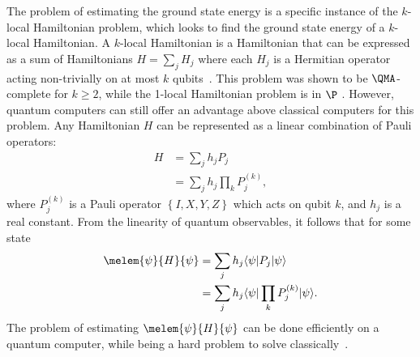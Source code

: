 The problem of estimating the ground state energy is a specific instance of the $k$-local Hamiltonian problem, which looks to find the ground state energy of a $k$-local Hamiltonian.
A $k$-local Hamiltonian is a Hamiltonian that can be expressed as a sum of Hamiltonians $H = \sum_{j}H_j$ where each $H_j$ is a Hermitian operator acting non-trivially on at most $k$ qubits~\cite{bookatz2012qma}.
This problem was shown to be $\QMA$-complete for $k \geq 2$, while the 1-local Hamiltonian problem is in $\P$ \cite{kempe2006complexity}.
However, quantum computers can still offer an advantage above classical computers for this problem.
Any Hamiltonian $H$ can be represented as a linear combination of Pauli operators:
\begin{align}
H &= \sum_j h_j P_j \\
  &= \sum_j h_j \prod_k P_j^{(k)},
\end{align} 
where $P_j^{(k)}$ is a Pauli operator $\left\{I, X, Y, Z\right\}$ which acts on qubit $k$, and $h_j$ is a real constant.
From the linearity of quantum observables, it follows that for some state \ket{\psi}
\begin{align}
\melem{\psi}{H}{\psi} &= \sum_j h_j \bra{\psi}P_j\ket{\psi} \\
&= \sum_j h_j \bra{\psi}\prod_k P_j^{(k)}\ket{\psi}.
\end{align} 
The problem of estimating $\melem{\psi}{H}{\psi}$ can be done efficiently on a quantum computer, while being a hard problem to solve classically~\cite{ortiz2001quantum, peruzzo2014variational, kandala2017hardware}.

